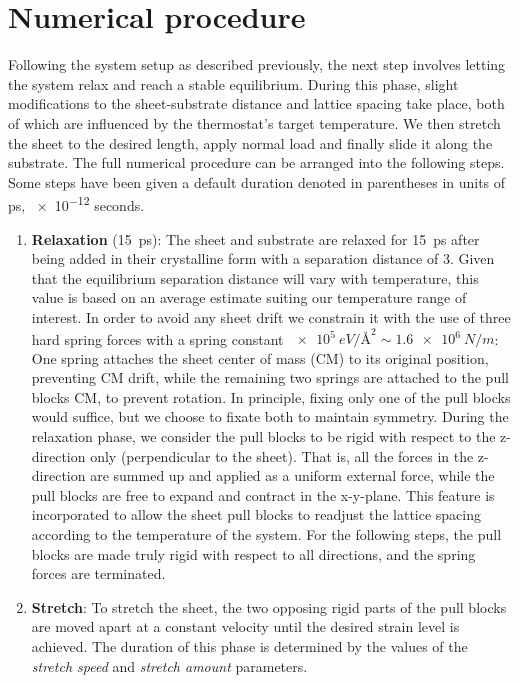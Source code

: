 \section{Numerical procedure}\label{sec:num_proc}
Following the system setup as described previously, the next step involves letting the system relax and reach a stable equilibrium. During this phase, slight modifications to the sheet-substrate distance and lattice spacing take place, both of which are influenced by the thermostat's target temperature. We then stretch the sheet to the desired length, apply normal load and finally slide it along the substrate. The full numerical procedure can be arranged into the following steps. Some steps have been given a default duration denoted in parentheses in units of ps, \num{e-12} seconds.
\begin{enumerate}
  \item \textbf{Relaxation} (\SI{15}{ps}): The sheet and substrate are relaxed for 
  \SI{15}{ps} after being added in their crystalline form with a separation distance of \SI{3}{}. Given that the equilibrium separation distance will vary with temperature, this value is based on an average estimate suiting our temperature range of interest. In order to avoid any sheet drift we constrain it with the use of three hard spring forces with a spring constant
  $\SI{e5}{eV/\text{Å}^2} \sim \SI{1.6e6}{N/m}$: One spring attaches the sheet center of mass (\acrshort{CM}) to its original position, preventing \acrshort{CM} drift, while the remaining two springs are attached to the pull blocks \acrshort{CM}, to prevent rotation. In principle, fixing only one of the pull blocks would suffice, but we choose to fixate both to maintain symmetry. During the relaxation phase, we consider the pull blocks to be rigid with respect to the z-direction only (perpendicular to the sheet). That is, all the forces in the z-direction are summed up and applied as a uniform external force, while the pull blocks are free to expand and contract in the x-y-plane. This feature is incorporated to allow the sheet pull blocks to readjust the lattice spacing according to the temperature of the system. For the following steps, the pull blocks are made truly rigid with respect to all directions, and the spring forces are terminated. 
  \item \textbf{Stretch}: To stretch the sheet, the two opposing rigid parts of the pull blocks are moved apart at a constant velocity until the desired strain level is achieved. The duration of this phase is determined by the values of the \textit{stretch speed} and \textit{stretch amount} parameters.

\end{enumerate}
